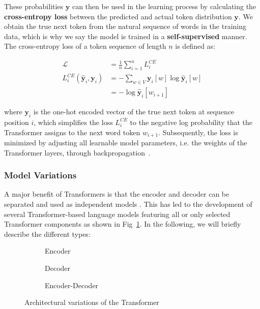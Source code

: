 These probabilities $\hat{\bm{y}}$ can then be used in the learning process by
calculating the \textbf{cross-entropy loss} between the predicted and actual
token distribution $\bm{y}$. We obtain the true next token from the natural
sequence of words in the training data, which is why we say the model is trained
in a \textbf{self-supervised} manner. The cross-entropy loss of a token sequence
of length $n$ is defined as:

\begin{align}
    \mathcal{L} &= \frac{1}{n}\sum_{i = 1}^{n}L_i^{CE} \\
    L_i^{CE}(\hat{\bm{y}}_i, \bm{y}_i) &= -\sum_{w \in V} \bm{y}_i[w] \log\hat{\bm{y}}_i[w] \\
    &= -\log\hat{\bm{y}}_i[w_{i+1}]
\end{align}

where $\bm{y}_i$ is the one-hot encoded vector of the true next token at
sequence position $i$, which simplifies the loss $L_i^{CE}$ to the negative log
probability that the Transformer assigns to the next word token $w_{i+1}$.
Subsequently, the loss is minimized by adjusting all learnable model parameters,
i.e. the weights of the Transformer layers, through
backpropagation~\cite{rumelhart1986learning}.

\subsubsection{Model Variations}
A major benefit of Transformers is that the encoder and decoder can be separated
and used as independent models \cite{min2023recent}. This has led to the
development of several Transformer-based language models featuring all or only
selected Transformer components as shown in Fig~\ref{fig:llm_types}. In the
following, we will briefly describe the different types:

\begin{figure}[htb]
    \centering
    \begin{subfigure}{0.24\textwidth}
        \centering
         
        \caption{Encoder}
    \end{subfigure}
    \hfill
    \begin{subfigure}{0.24\textwidth}
        \centering
         
        \caption{Decoder}
    \end{subfigure}
    \hfill
    \begin{subfigure}{0.49\textwidth}
        \centering
         
        \caption{Encoder-Decoder}
    \end{subfigure}
    \caption{Architectural variations of the Transformer}
    \label{fig:llm_types}
\end{figure}

